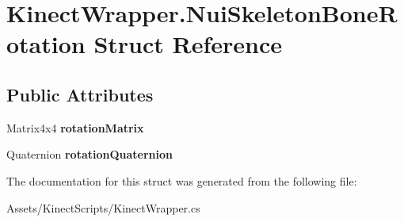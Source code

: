 \hypertarget{struct_kinect_wrapper_1_1_nui_skeleton_bone_rotation}{}\section{Kinect\+Wrapper.\+Nui\+Skeleton\+Bone\+Rotation Struct Reference}
\label{struct_kinect_wrapper_1_1_nui_skeleton_bone_rotation}
\subsection*{Public Attributes}
\begin{DoxyCompactItemize}
\item 
\mbox{\label{struct_kinect_wrapper_1_1_nui_skeleton_bone_rotation_a2e27e61c545548e21cab9f1fe98b2fc5}} 
Matrix4x4 {\bfseries rotation\+Matrix}
\item 
\mbox{\label{struct_kinect_wrapper_1_1_nui_skeleton_bone_rotation_a9333030915c2c11562fd913873d8b4e1}} 
Quaternion {\bfseries rotation\+Quaternion}
\end{DoxyCompactItemize}


The documentation for this struct was generated from the following file\+:\begin{DoxyCompactItemize}
\item 
Assets/\+Kinect\+Scripts/Kinect\+Wrapper.\+cs\end{DoxyCompactItemize}
